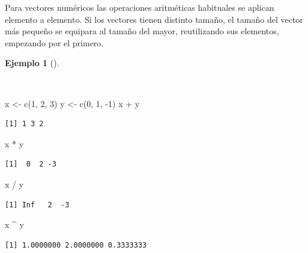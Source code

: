 \documentclass[
  a4paper,
]{scrreport}
\newenvironment{Shaded}{\begin{snugshade}}{\end{snugshade}}
\newcommand{\DecValTok}[1]{\textcolor[rgb]{0.68,0.00,0.00}{#1}}
\newcommand{\FunctionTok}[1]{\textcolor[rgb]{0.28,0.35,0.67}{#1}}
\newcommand{\NormalTok}[1]{\textcolor[rgb]{0.00,0.23,0.31}{#1}}
\newcommand{\OtherTok}[1]{\textcolor[rgb]{0.00,0.23,0.31}{#1}}
\newcommand{\SpecialCharTok}[1]{\textcolor[rgb]{0.37,0.37,0.37}{#1}}
\theoremstyle{definition}
\theoremstyle{definition}
\newtheorem{example}{Ejemplo}[chapter]
\theoremstyle{remark}
\begin{document}
Para vectores numéricos las operaciones aritméticas habituales se
aplican elemento a elemento. Si los vectores tienen distinto tamaño, el
tamaño del vector más pequeño se equipara al tamaño del mayor,
reutilizando sus elementos, empezando por el primero.

\begin{example}[]\protect\hypertarget{exm-operaciones-aritmeticas-vectores}{}\label{exm-operaciones-aritmeticas-vectores}

~

\begin{Shaded}
\begin{Highlighting}[]
\NormalTok{x }\OtherTok{\textless{}{-}} \FunctionTok{c}\NormalTok{(}\DecValTok{1}\NormalTok{, }\DecValTok{2}\NormalTok{, }\DecValTok{3}\NormalTok{)}
\NormalTok{y }\OtherTok{\textless{}{-}} \FunctionTok{c}\NormalTok{(}\DecValTok{0}\NormalTok{, }\DecValTok{1}\NormalTok{, }\SpecialCharTok{{-}}\DecValTok{1}\NormalTok{)}
\NormalTok{x }\SpecialCharTok{+}\NormalTok{ y}
\end{Highlighting}
\end{Shaded}

\begin{verbatim}
[1] 1 3 2
\end{verbatim}

\begin{Shaded}
\begin{Highlighting}[]
\NormalTok{x }\SpecialCharTok{*}\NormalTok{ y}
\end{Highlighting}
\end{Shaded}

\begin{verbatim}
[1]  0  2 -3
\end{verbatim}

\begin{Shaded}
\begin{Highlighting}[]
\NormalTok{x }\SpecialCharTok{/}\NormalTok{ y}
\end{Highlighting}
\end{Shaded}

\begin{verbatim}
[1] Inf   2  -3
\end{verbatim}

\begin{Shaded}
\begin{Highlighting}[]
\NormalTok{x }\SpecialCharTok{\^{}}\NormalTok{ y}
\end{Highlighting}
\end{Shaded}

\begin{verbatim}
[1] 1.0000000 2.0000000 0.3333333
\end{verbatim}

\end{example}
\end{document}
